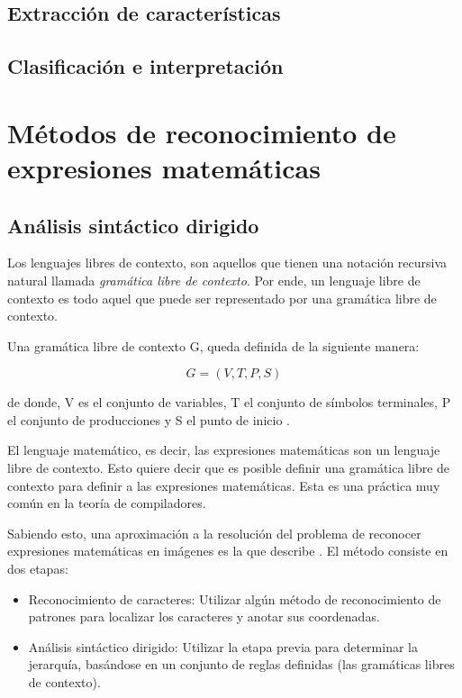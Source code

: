         \subsection{Extracción de características}
            
        \subsection{Clasificación e interpretación}


\section{Métodos de reconocimiento de expresiones matemáticas}
\subsection{Análisis sintáctico dirigido}
Los lenguajes libres de contexto, son aquellos que tienen una notación recursiva natural llamada \textit{gramática libre de contexto}. Por ende, un lenguaje libre de contexto es todo aquel que puede ser representado por una gramática libre de contexto.

Una gramática libre de contexto G, queda definida de la siguiente manera:

\begin{equation}
    G = (V, T, P, S)
\end{equation}

de donde, V es el conjunto de variables, T el conjunto de símbolos terminales, P el conjunto de producciones y S el punto de inicio \cite{automata}.

El lenguaje matemático, es decir, las expresiones matemáticas son un lenguaje libre de contexto. Esto quiere decir que es posible definir una gramática libre de contexto para definir a las expresiones matemáticas. Esta es una práctica muy común en la teoría de compiladores.

Sabiendo esto, una aproximación a la resolución del problema de reconocer expresiones matemáticas en imágenes es la que describe \cite{gramaticasAnderson}. El método consiste en dos etapas:

\begin{itemize}
    \item Reconocimiento de caracteres: Utilizar algún método de reconocimiento de patrones para localizar los caracteres y anotar sus coordenadas. 
    \item Análisis sintáctico dirigido: Utilizar la etapa previa para determinar la jerarquía, basándose en un conjunto de reglas definidas (las gramáticas libres de contexto).
\end{itemize}


